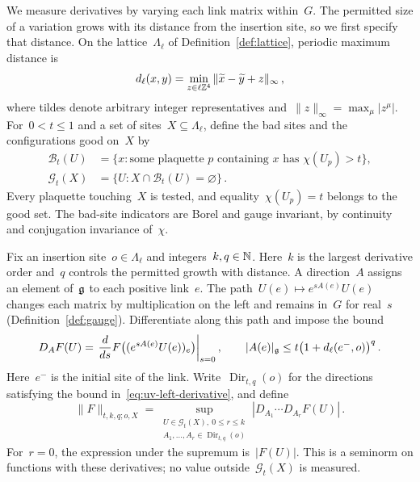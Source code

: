 We measure derivatives by varying each link matrix within~$G$.
The permitted size of a variation grows with its distance from the insertion site, so we first specify that distance.
On the lattice~$\Lambda_\ell$ of Definition~\ref{def:lattice}, periodic maximum distance is
\begin{equation}\label{eq:uv-periodic-distance}
 d_\ell(x,y)=\min_{z\in\ell\mathbb Z^4}\|\widetilde x-\widetilde y+z\|_\infty\,,
\end{equation}
where tildes denote arbitrary integer representatives and~$\|z\|_\infty=\max_\mu|z^\mu|$.
For~$0<t\le1$ and a set of sites~$X\subseteq\Lambda_\ell$, define the bad sites and the configurations good on~$X$ by
\begin{equation}\label{eq:uv-good-configurations}
 \begin{aligned}
 \mathcal B_t(U)&=\{x:\text{some plaquette $p$ containing $x$ has $\chi(U_p)>t$}\},\\
 \mathcal G_t(X)&=\{U:X\cap\mathcal B_t(U)=\varnothing\}\,.
 \end{aligned}
\end{equation}
Every plaquette touching~$X$ is tested, and equality~$\chi(U_p)=t$ belongs to the good set.
The bad-site indicators are Borel and gauge invariant, by continuity and conjugation invariance of~$\chi$.

Fix an insertion site~$o\in\Lambda_\ell$ and integers~$k,q\in\mathbb N$.
Here~$k$ is the largest derivative order and~$q$ controls the permitted growth with distance.
A direction~$A$ assigns an element of~$\mathfrak g$ to each positive link~$e$.
The path~$U(e)\mapsto e^{sA(e)}U(e)$ changes each matrix by multiplication on the left and remains in~$G$ for real~$s$ (Definition~\ref{def:gauge}).
Differentiate along this path and impose the bound
\begin{equation}\label{eq:uv-left-derivative}
 D_AF(U)=\left.\frac{d}{ds}F\bigl((e^{sA(e)}U(e))_e\bigr)\right|_{s=0},\qquad
 |A(e)|_\mathfrak g\le t\bigl(1+d_\ell(e^-,o)\bigr)^q\,.
\end{equation}
Here~$e^-$ is the initial site of the link.
Write~$\operatorname{Dir}_{t,q}(o)$ for the directions satisfying the bound in~\eqref{eq:uv-left-derivative}, and define
\begin{equation}\label{eq:uv-activity-seminorm}
 \|F\|_{t,k,q;o,X}
 =\sup_{\substack{U\in\mathcal G_t(X),\ 0\le r\le k\\
                   A_1,\ldots,A_r\in\operatorname{Dir}_{t,q}(o)}}
       |D_{A_1}\cdots D_{A_r}F(U)|\,.
\end{equation}
For~$r=0$, the expression under the supremum is~$|F(U)|$.
This is a seminorm on functions with these derivatives; no value outside~$\mathcal G_t(X)$ is measured.

